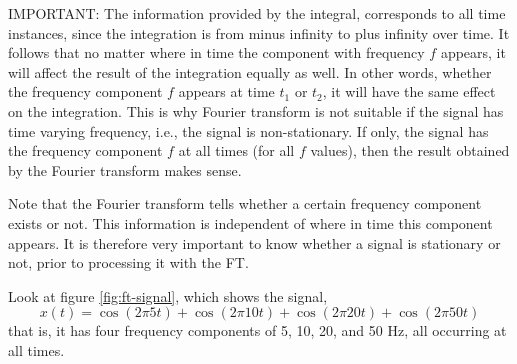 \documentclass[12pt, a4paper, twoside]{report}
\begin{document}
IMPORTANT: The information provided by the integral, corresponds to all time instances, since the integration is from minus infinity to plus infinity over time. It follows that no matter where in time the component with frequency $f$ appears, it will affect the result of the integration equally as well. In other words, whether the frequency component $f$ appears at time $t_1$ or $t_2$, it will have the same effect on the integration. This is why Fourier transform is not suitable if the signal has time varying frequency, i.e., the signal is non-stationary. If only, the signal has the frequency component $f$ at all times (for all $f$ values), then the result obtained by the Fourier transform makes sense.
\par
Note that the Fourier transform tells whether a certain frequency component exists or not. This information is independent of where in time this component appears. It is therefore very important to know whether a signal is stationary or not, prior to processing it with the FT.
\par
Look at figure \ref{fig:ft-signal}, which shows the signal,
\begin{equation}
x(t) = \cos(2\pi 5t) + \cos(2\pi 10t) + \cos(2\pi 20t) + \cos(2\pi 50t)
\label{eq:ft-signal}
\end{equation}
that is, it has four frequency components of 5, 10, 20, and 50 Hz, all occurring at all times.
\end{document}
